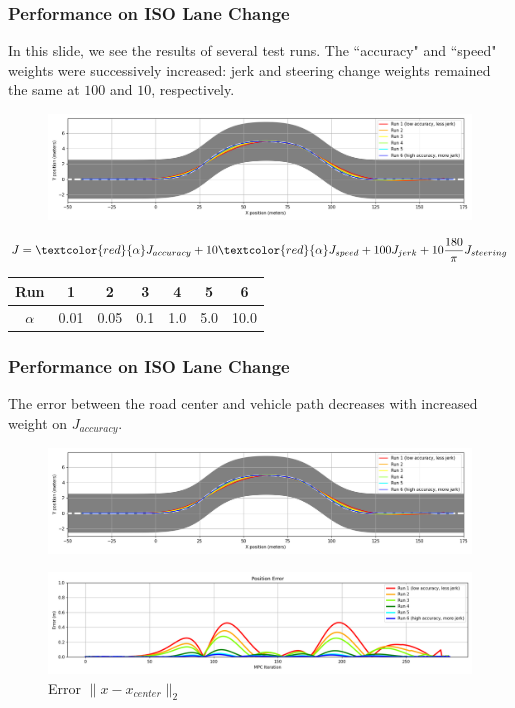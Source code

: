 \documentclass{beamer}
\begin{document}
\begin{frame}
\frametitle{Performance on ISO Lane Change}

In this slide, we see the results of several test runs. The ``accuracy" and ``speed" weights were successively increased: jerk and steering change weights remained the same at $100$ and $10$, respectively.


\begin{figure}
	\centering
	\includegraphics[width=1.0\linewidth]{figures/road_paths.png}
\end{figure}
\vspace{-0.5em}
\small
$$J = \textcolor{red}{\alpha} J_{accuracy} + 10\textcolor{red}{\alpha} J_{speed} + 100 J_{jerk} + 10\frac{180}{\pi} J_{steering}$$

\begin{table}
	\begin{tabular}{c|cccccc}
Run & 1 & 2 & 3 & 4 & 5 & 6
\\\hline
$\alpha$ & 0.01 & 0.05 & 0.1 & 1.0 & 5.0 & 10.0
\end{tabular}
\end{table}
\normalsize
\end{frame}



\begin{frame}
\frametitle{Performance on ISO Lane Change}

The error between the road center and vehicle path decreases with increased weight on $J_{accuracy}$.

\vspace{-0.5em}
\begin{figure}
	\includegraphics[width=1.0\linewidth]{figures/road_paths.png}
\end{figure}
\vspace{-1.5em}

\begin{figure}
	\includegraphics[width=1.0\linewidth]{figures/errors.png}
		\caption{Error $\|x-x_{center}\|_2$}
\end{figure}
\end{frame}
\end{document}
